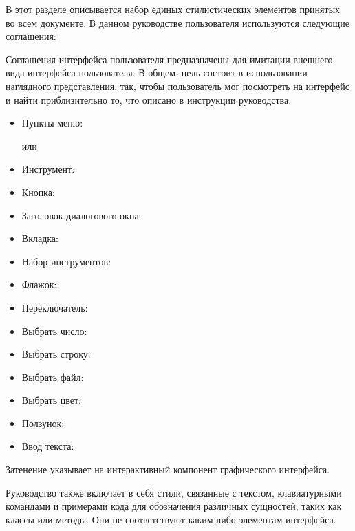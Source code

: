 \label{label_conventions}

В этот разделе описывается набор единых стилистических элементов
принятых во всем документе. В данном руководстве пользователя
используются следующие соглашения:


Соглашения интерфейса пользователя предназначены для имитации внешнего
вида интерфейса пользователя. В общем, цель состоит в использовании
наглядного представления, так, чтобы пользователь мог посмотреть на
интерфейс и найти приблизительно то, что описано в инструкции
руководства.

\begin{itemize}[label=--,itemsep=5pt]
\item Пункты меню:  \arrow
{}

или

 \arrow
{} \arrow {}
\item Инструмент: 
\item Кнопка: 
\item Заголовок диалогового окна: 
\item Вкладка: 
\item Набор инструментов: 
\item Флажок: 
\item Переключатель:   
\item Выбрать число: 
\item Выбрать строку: 
\item Выбрать файл: \browsebutton
\item Выбрать цвет: 
\item Ползунок: 
\item Ввод текста: 
\end{itemize}
Затенение указывает на интерактивный компонент графического интерфейса.


Руководство также включает в себя стили, связанные с текстом,
клавиатурными командами и примерами кода для обозначения различных
сущностей, таких как классы или методы. Они не соответствуют каким-либо
элементам интерфейса.

